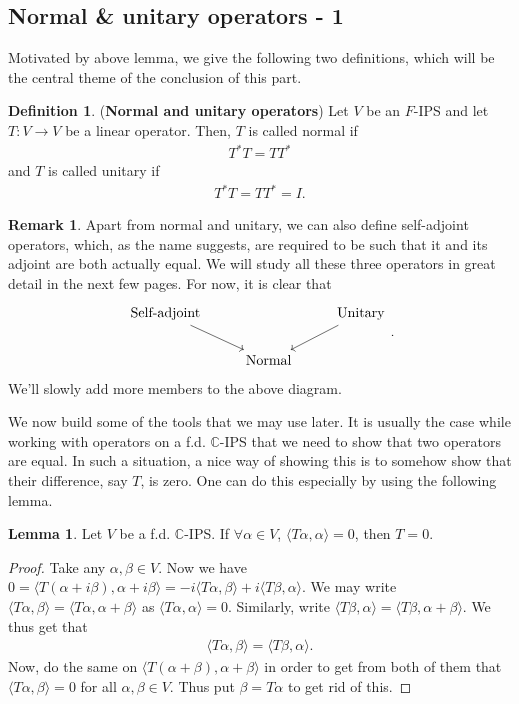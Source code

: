 \documentclass[letterpaper,11pt,twoside]{article}
\theoremstyle{definition}
\theoremstyle{definition}
\newtheorem{definition}[proposition]{Definition}
\theoremstyle{definition}
\newtheorem{remark}[proposition]{\textbf{Remark}}
\theoremstyle{definition}
\newtheorem{lemma}[proposition]{\textbf{Lemma}}
\theoremstyle{definition}
\theoremstyle{definition}
\theoremstyle{remark}
\theoremstyle{definition}
\newcommand{\ip}[2]{\langle #1,#2 \rangle}
\newcommand{\C}{\mathbb{C}}
\begin{document}
	\subsection{Normal \& unitary operators - 1}
	Motivated by above lemma, we give the following two definitions, which will be the central theme of the conclusion of this part.
	\begin{definition}
		(\textbf{Normal and unitary operators}) Let $ V $ be an $ F $-IPS and let $ T :V\to V $ be a linear operator. Then, $ T $ is called normal if
		\begin{align*}
			T^{*}T = TT^{*}
		\end{align*}
		and $ T $ is called unitary if
		\begin{align*}
			T^{*}T = TT^{*}=I.
		\end{align*}
	\end{definition}
	\begin{remark}\label{R-4.3.2}
		Apart from normal and unitary, we can also define self-adjoint operators, which, as the name suggests, are required to be such that it and its adjoint are both actually equal. We will study all these three operators in great detail in the next few pages. For now, it is clear that 
		\[\begin{tikzcd}
			{\text{Self-adjoint}} && {\text{Unitary}} \\
			& {\text{Normal}}
			\arrow[from=1-1, to=2-2]
			\arrow[from=1-3, to=2-2]
		\end{tikzcd}.\]
		We'll slowly add more members to the above diagram.
	\end{remark}
	We now build some of the tools that we may use later. It is usually the case while working with operators on a f.d. $ \C $-IPS that we need to show that two operators are equal. In such a situation, a nice way of showing this is to somehow show that their difference, say $ T $, is zero. One can do this especially by using the following lemma. 
	\begin{lemma}\label{L-4.2.9}
		Let $ V $ be a f.d. $ \C $-IPS. If $ \forall \alpha \in V $, $ \ip{T\alpha}{\alpha} = 0 $, then $ T=0 $.
	\end{lemma}
	\begin{proof}
		Take any $ \alpha,\beta  \in V$. Now we have $ 0=\ip{T(\alpha + i\beta)}{\alpha + i\beta} = -i\ip{T\alpha}{\beta} + i\ip{T\beta}{\alpha}$. We may write $ \ip{T\alpha}{\beta} = \ip{T\alpha}{\alpha+\beta} $ as $ \ip{T\alpha}{\alpha} = 0 $. Similarly, write $ \ip{T\beta}{\alpha} = \ip{T\beta}{\alpha + \beta} $. We thus get that
		\begin{align*}
		\ip{T\alpha}{\beta} = \ip{T\beta}{\alpha}.
		\end{align*}
		Now, do the same on $ \ip{T(\alpha+\beta)}{\alpha + \beta} $ in order to get from both of them that $ \ip{T\alpha}{\beta} = 0$ for all $ \alpha,\beta \in V $. Thus put $ \beta = T\alpha $ to get rid of this.
	\end{proof}
\end{document}
